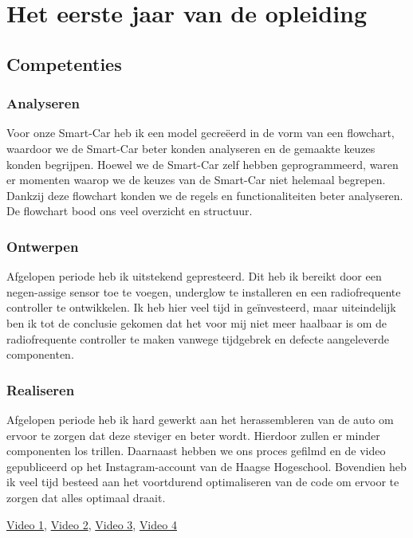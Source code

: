 \section{Het eerste jaar van de opleiding}
\subsection{Competenties}
\subsubsection{Analyseren}
Voor onze \gls{Smart-Car} heb ik een model gecreëerd in de vorm van een \gls{flowchart}, waardoor we de \gls{Smart-Car} beter konden analyseren en de gemaakte keuzes konden begrijpen. Hoewel we de \gls{Smart-Car} zelf hebben geprogrammeerd, waren er momenten waarop we de keuzes van de \gls{Smart-Car} niet helemaal begrepen. Dankzij deze \gls{flowchart} konden we de regels en functionaliteiten beter analyseren. De \gls{flowchart} bood ons veel overzicht en structuur.
\subsubsection{Ontwerpen}
Afgelopen periode heb ik uitstekend gepresteerd. Dit heb ik bereikt door een negen-assige sensor toe te voegen, \gls{underglow} te installeren en een radiofrequente controller te ontwikkelen. Ik heb hier veel tijd in geïnvesteerd, maar uiteindelijk ben ik tot de conclusie gekomen dat het voor mij niet meer haalbaar is om de radiofrequente controller te maken vanwege tijdgebrek en defecte aangeleverde componenten.
\subsubsection{Realiseren}
Afgelopen periode heb ik hard gewerkt aan het herassembleren van de auto om ervoor te zorgen dat deze steviger en beter wordt. Hierdoor zullen er minder componenten los trillen. Daarnaast hebben we ons proces gefilmd en de video gepubliceerd op het Instagram-account van de Haagse Hogeschool. Bovendien heb ik veel tijd besteed aan het voortdurend optimaliseren van de code om ervoor te zorgen dat alles optimaal draait.

\href{https://www.instagram.com/reel/CpfstIiKLpz/?utm_source=ig_web_copy_link&igshid=MzRlODBiNWFlZA==}{Video 1},
\href{https://www.instagram.com/reel/CqDmm-vK4Lq/?utm_source=ig_web_copy_link&igshid=MzRlODBiNWFlZA==}{Video 2},
\href{https://www.instagram.com/reel/CqqS0jyOCNk/?utm_source=ig_web_copy_link&igshid=MzRlODBiNWFlZA==}{Video 3},
\href{https://www.instagram.com/reel/CrI-imUqiAH/?utm_source=ig_web_copy_link&igshid=MzRlODBiNWFlZA==}{Video 4}
